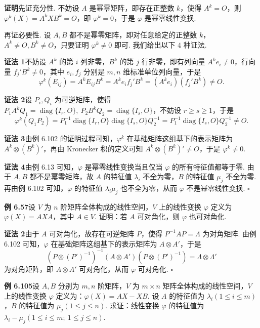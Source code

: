 \documentclass[UTF8,12pt,a4paper,fontset=fandol]{ctexart}
\begin{document}
\noindent\textbf{证明}\quad 先证充分性. 不妨设 $A$ 是幂零矩阵，即存在正整数 $k$，使得 $A^k=O$，则 $\varphi^k(X)=A^kXB^k=O$，即 $\varphi^k=0$，于是 $\varphi$ 是幂零线性变换.

再证必要性. 设 $A,B$ 都不是幂零矩阵，即对任意给定的正整数 $k$，$A^k\ne O,B^k\ne O$，只要证明 $\varphi^k\ne 0$ 即可. 我们给出以下 $4$ 种证法.

\noindent\textbf{证法 1}\quad 不妨设 $A^k$ 的第 $i$ 列非零，$B^k$ 的第 $j$ 行非零，即有列向量 $A^ke_i\ne 0$，行向量 $f_j'B^k\ne 0$，其中 $e_i,f_j$ 分别是 $m,n$ 维标准单位列向量，于是
\[
\varphi^k(E_{ij})=A^kE_{ij}B^k=A^ke_if_j'B^k=(A^ke_i)(f_j'B^k)\ne O.
\]

\noindent\textbf{证法 2}\quad 设 $P_i,Q_i$ 为可逆矩阵，使得 $P_1A^kQ_1=\operatorname{diag}\{I_r,O\},\ P_2B^kQ_2=\operatorname{diag}\{I_s,O\}$，不妨设 $r\ge s\ge 1$，于是
\[
\varphi^k(Q_1P_2)=P_1^{-1}\operatorname{diag}\{I_r,O\}\operatorname{diag}\{I_s,O\}Q_2^{-1}=P_1^{-1}\operatorname{diag}\{I_s,O\}Q_2^{-1}\ne O.
\]

\noindent\textbf{证法 3}\quad 由例 6.102 的证明过程可知，$\varphi^k$ 在基础矩阵这组基下的表示矩阵为 $A^k\otimes(B^k)'$，再由 Kronecker 积的定义可知 $A^k\otimes(B^k)'\ne O$，于是 $\varphi^k\ne 0$.

\noindent\textbf{证法 4}\quad 由例 6.13 可知，$\varphi$ 是幂零线性变换当且仅当 $\varphi$ 的所有特征值都等于零. 由于 $A,B$ 都不是幂零矩阵，故 $A$ 的特征值 $\lambda_i$ 不全为零，$B$ 的特征值 $\mu_j$ 不全为零. 再由例 6.102 可知，$\varphi$ 的特征值 $\lambda_i\mu_j$ 也不全为零，从而 $\varphi$ 不是幂零线性变换. $\square$

\noindent\textbf{例 6.57}\quad 设 $V$ 为 $n$ 阶矩阵全体构成的线性空间，$V$ 上的线性变换 $\varphi$ 定义为 $\varphi(X)=AXA$，其中 $A\in V$. 证明：若 $A$ 可对角化，则 $\varphi$ 也可对角化.

\noindent\textbf{证法 2}\quad 由于 $A$ 可对角化，故存在可逆矩阵 $P$，使得 $P^{-1}AP=\Lambda$ 为对角矩阵. 由例 6.102 可知，$\varphi$ 在基础矩阵这组基下的表示矩阵为 $A\otimes A'$，于是
\[
(P\otimes(P')^{-1})^{-1}(A\otimes A')(P\otimes(P')^{-1})=\Lambda\otimes\Lambda'
\]
为对角矩阵，即 $A\otimes A'$ 可对角化，从而 $\varphi$ 可对角化. $\square$

\noindent\textbf{例 6.105}\quad 设 $A,B$ 分别为 $m,n$ 阶矩阵，$V$ 为 $m\times n$ 矩阵全体构成的线性空间，$V$ 上的线性变换 $\varphi$ 定义为：$\varphi(X)=AX-XB$. 设 $A$ 的特征值为 $\lambda_i(1\le i\le m)$，$B$ 的特征值为 $\mu_j(1\le j\le n)$. 求证：线性变换 $\varphi$ 的特征值为 $\lambda_i-\mu_j(1\le i\le m;\ 1\le j\le n)$.
\end{document}
